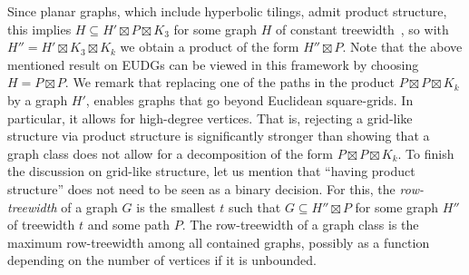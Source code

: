 Since planar graphs, which include hyperbolic tilings, admit product structure, this implies $ H \subseteq H' \boxtimes P \boxtimes K_3 $ for some graph $ H $ of constant treewidth~\cite{dujmovic_planar_2019,dujmovic_planar_2019_conf}, so with $ H'' = H' \boxtimes K_3 \boxtimes K_k $ we obtain a product of the form $ H'' \boxtimes P $.
Note that the above mentioned result on EUDGs can be viewed in this framework by choosing $ H = P \boxtimes P $.
% 
%
We remark that replacing one of the paths in the product $ P \boxtimes P \boxtimes K_k $ by a graph $ H' $, enables graphs that go beyond Euclidean square-grids.
In particular, it allows for high-degree vertices.
That is, rejecting a grid-like structure via product structure is significantly stronger than showing that a graph class does not allow for a decomposition of the form $ P \boxtimes P \boxtimes K_k $.
%
To finish the discussion on grid-like structure, let us mention that \enquote{having product structure} does not need to be seen as a binary decision.
For this, the \emph{row-treewidth} of a graph $ G $ is the smallest $ t $ such that $ G \subseteq H'' \boxtimes P $ for some graph $ H'' $ of treewidth $ t $ and some path $ P $.
The row-treewidth of a graph class is the maximum row-treewidth among all contained graphs, possibly as a function depending on the number of vertices if it is unbounded.
